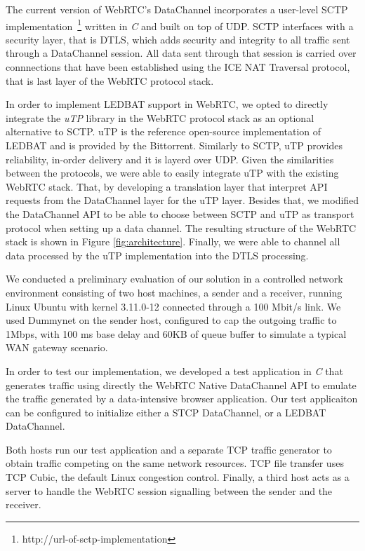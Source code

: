 \documentclass{sig-alternate}
\begin{document}
The current version of WebRTC's DataChannel incorporates a user-level SCTP
implementation~\footnote{http://url-of-sctp-implementation} written in \textit{C} and built
on top of UDP. SCTP interfaces with a security layer, that is DTLS, which adds security
and integrity to all traffic sent through a DataChannel session. All data sent through
that session is carried over connnections that have been established using the ICE NAT
Traversal protocol, that is last layer of the WebRTC protocol stack.

In order to implement LEDBAT support in WebRTC, we opted to directly integrate the
\textit{uTP} library \cite{utp-repo} in the WebRTC protocol stack as an optional
alternative to SCTP. uTP is the reference open-source implementation of LEDBAT and is
provided by the Bittorrent. Similarly to SCTP, uTP provides reliability, in-order delivery
and it is layerd over UDP. Given the similarities between the protocols, we were able to
easily integrate uTP with the existing WebRTC stack. That, by developing a translation
layer that interpret API requests from the DataChannel layer for the uTP layer. Besides
that, we modified the DataChannel API to be able to choose between SCTP and uTP as
transport protocol when setting up a data channel. The resulting structure of the WebRTC
stack is shown in Figure \ref{fig:architecture}. Finally, we were able to channel all data
processed by the uTP implementation into the DTLS processing.


\label{sec:architecture}


We conducted a preliminary evaluation of our solution in a controlled network environment
consisting of two host machines, a sender and a receiver, running Linux Ubuntu with kernel
3.11.0-12 connected through a 100 Mbit/s link. We used Dummynet on the sender host,
configured to cap the outgoing traffic to 1Mbps, with 100 ms base delay and 60KB of queue
buffer to simulate a typical WAN gateway scenario. 

In order to test our implementation, we developed a test application in \textit{C} that
generates traffic using directly the WebRTC Native DataChannel API to emulate the traffic
generated by a data-intensive browser application. Our test applicaiton can be configured
to initialize either a STCP DataChannel, or a LEDBAT DataChannel.

Both hosts run our test application and a separate TCP traffic generator to obtain traffic
competing on the same network resources. TCP file transfer uses TCP Cubic, the default
Linux congestion control. Finally, a third host acts as a server to handle the WebRTC
session signalling between the sender and the receiver.
\end{document}
